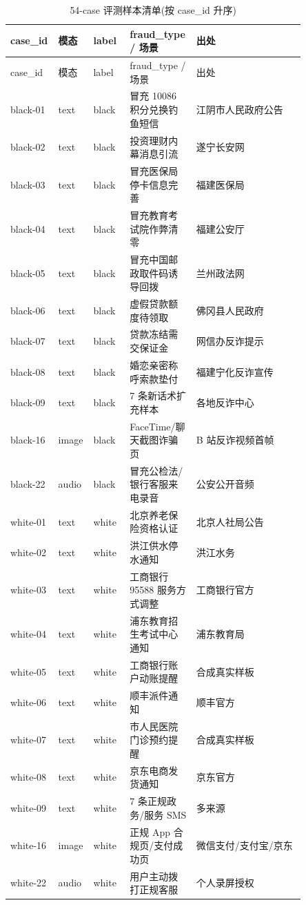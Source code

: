 \documentclass[UTF8,a4paper,12pt]{ctexart}
\begin{document}
\begin{longtable}{p{0.11\linewidth}p{0.09\linewidth}p{0.12\linewidth}p{0.17\linewidth}p{0.36\linewidth}}
    \caption{54-case 评测样本清单(按 case\_id 升序)}
    \label{tab:case-list} \\
    \toprule
    case\_id & 模态 & label & fraud\_type / 场景 & 出处 \\
    \midrule
    \endfirsthead
    \toprule
    case\_id & 模态 & label & fraud\_type / 场景 & 出处 \\
    \midrule
    \endhead
    black-01 & text & black & 冒充 10086 积分兑换钓鱼短信 & 江阴市人民政府公告 \\
    black-02 & text & black & 投资理财内幕消息引流 & 遂宁长安网 \\
    black-03 & text & black & 冒充医保局停卡信息完善 & 福建医保局 \\
    black-04 & text & black & 冒充教育考试院作弊清零 & 福建公安厅 \\
    black-05 & text & black & 冒充中国邮政取件码诱导回拨 & 兰州政法网 \\
    black-06 & text & black & 虚假贷款额度待领取 & 佛冈县人民政府 \\
    black-07 & text & black & 贷款冻结需交保证金 & 网信办反诈提示 \\
    black-08 & text & black & 婚恋亲密称呼索款垫付 & 福建宁化反诈宣传 \\
    black-09\textendash 15 & text & black & 7 条新话术扩充样本 & 各地反诈中心 \\
    black-16\textendash 21 & image & black & FaceTime/聊天截图诈骗页 & B 站反诈视频首帧 \\
    black-22\textendash 27 & audio & black & 冒充公检法/银行客服来电录音 & 公安公开音频 \\
    white-01 & text & white & 北京养老保险资格认证 & 北京人社局公告 \\
    white-02 & text & white & 洪江供水停水通知 & 洪江水务 \\
    white-03 & text & white & 工商银行 95588 服务方式调整 & 工商银行官方 \\
    white-04 & text & white & 浦东教育招生考试中心通知 & 浦东教育局 \\
    white-05 & text & white & 工商银行账户动账提醒 & 合成真实样板 \\
    white-06 & text & white & 顺丰派件通知 & 顺丰官方 \\
    white-07 & text & white & 市人民医院门诊预约提醒 & 合成真实样板 \\
    white-08 & text & white & 京东电商发货通知 & 京东官方 \\
    white-09\textendash 15 & text & white & 7 条正规政务/服务 SMS & 多来源 \\
    white-16\textendash 21 & image & white & 正规 App 合规页/支付成功页 & 微信支付/支付宝/京东 \\
    white-22\textendash 27 & audio & white & 用户主动拨打正规客服 & 个人录屏授权 \\
    \bottomrule
\end{longtable}
\end{document}
